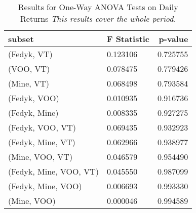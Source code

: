 \begin{appendices}
\begin{table}[ht]
\centering
\caption{Results for One-Way ANOVA Tests on Daily Returns 
\newline \footnotesize{\textit{This results cover the whole period.}}}
    \begin{tabular}{lll}
    \toprule
        \textbf{subset}        & \multicolumn{1}{r}{\textbf{F Statistic}} & \multicolumn{1}{r}{\textbf{p-value}} \\ \midrule
        (Fedyk, VT)            & 0.123106                                 & 0.725755                             \\
        (VOO, VT)              & 0.078475                                 & 0.779426                             \\
        (Mine, VT)             & 0.068498                                 & 0.793584                             \\
        (Fedyk, VOO)           & 0.010935                                 & 0.916736                             \\
        (Fedyk, Mine)          & 0.008335                                 & 0.927275                             \\
        (Fedyk, VOO, VT)       & 0.069435                                 & 0.932923                             \\
        (Fedyk, Mine, VT)      & 0.062966                                 & 0.938977                             \\
        (Mine, VOO, VT)        & 0.046579                                 & 0.954490                             \\
        (Fedyk, Mine, VOO, VT) & 0.045550                                 & 0.987099                             \\
        (Fedyk, Mine, VOO)     & 0.006693                                 & 0.993330                             \\
        (Mine, VOO)            & 0.000046                                 & 0.994589                            
    \end{tabular}
\label{tab:anova_all}
\end{table}



\end{appendices}
